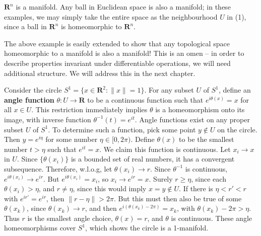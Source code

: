 
\begin{example}
    $\mathbf{R}^n$ is a manifold. Any ball in Euclidean space is also a manifold; in these examples, we may simply take the entire space as the neighbourhood $U$ in (1), since a ball in $\mathbf{R}^n$ is homeomorphic to $\mathbf{R}^n$.
\end{example}

The above example is easily extended to show that any topological space homeomorphic to a manifold is also a manifold! This is an omen -- in order to describe properties invariant under differentiable operations, we will need additional structure. We will address this in the next chapter.

\begin{example}
    Consider the circle $S^1 = \{ x \in \mathbf{R}^2 : \|x\| = 1 \}$. For any subset $U$ of $S^1$, define an {\bf angle function} $\theta:U \to \mathbf{R}$ to be a continuous function such that $e^{i\theta(x)} = x$ for all $x \in U$. This restriction immediately implies $\theta$ is a homeomorphism onto its image, with inverse function $\theta^{-1}(t) = e^{it}$. Angle functions exist on any proper subset $U$ of $S^1$. To determine such a function, pick some point $y \not \in U$ on the circle. Then $y = e^{i\eta}$ for some number $\eta \in [0,2\pi)$. Define $\theta(x)$ to be the smallest number $t > \eta$ such that $e^{it} = x$. We claim this function is continuous. Let $x_i \to x$ in $U$. Since $\{ \theta(x_i) \}$ is a bounded set of real numbers, it has a convergent subsequence. Therefore, w.l.o.g, let $\theta(x_i) \to r$. Since $\theta^{-1}$ is continuous, $e^{i\theta(x_i)} \to e^{ir}$. But $e^{i\theta(x_i)} = x_i$, so $x_i \to e^{ir} = x$. Surely $r \geq \eta$, since each $\theta(x_i) > \eta$, and $r \neq \eta$, since this would imply $x = y \not \in U$. If there is $\eta < r' < r$ with $e^{ir'} = e^{ir}$, then $\| r - \eta \| > 2 \pi$. But this must then also be true of some $\theta(x_k)$, since $\theta(x_k) \to r$, and then $e^{i(\theta(x_k) - 2 \pi)} = x_k$, with $\theta(x_k) - 2 \pi > \eta$. Thus $r$ is the smallest angle choice, $\theta(x) = r$, and $\theta$ is continuous. These angle homeomorphisms cover $S^1$, which shows the circle is a 1-manifold.
\end{example}

